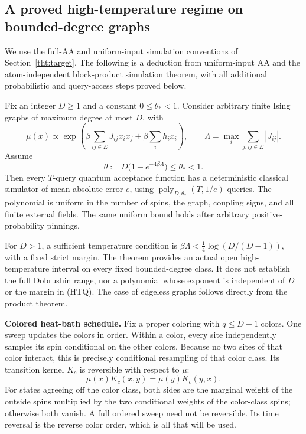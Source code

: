 \subsection{A proved high-temperature regime on bounded-degree graphs}
\label{resolution-dynamics:theorem}

We use the full-AA and uniform-input simulation conventions of
Section~\ref{tht:target}. The following is a deduction from uniform-input
AA and the atom-independent block-product simulation theorem, with all
additional probabilistic and query-access steps proved below.

\begin{theorem}
\label{thm:resolution-dynamics-ising}
Fix an integer \(D\ge1\) and a constant \(0\le\theta_*<1\). Consider
arbitrary finite Ising graphs of maximum degree at most \(D\), with
\[
 \mu(x)\propto\exp\left(
     \beta\sum_{ij\in E}J_{ij}x_ix_j+\beta\sum_i h_ix_i\right),
 \qquad
 \Lambda=\max_i\sum_{j:ij\in E}|J_{ij}|.
\]
Assume
\[
 \theta:=D\bigl(1-e^{-4\beta\Lambda}\bigr)\le\theta_*<1.
 \tag{HTQ}
\]
Then every \(T\)-query quantum acceptance function has a deterministic
classical simulator of mean absolute error \(e\), using
\(\operatorname{poly}_{D,\theta_*}(T,1/e)\) queries. The polynomial
is uniform in the number of spins, the graph, coupling signs, and all
finite external fields. The same uniform bound holds after arbitrary
positive-probability pinnings.
\end{theorem}

For \(D>1\), a sufficient temperature condition is
\(\beta\Lambda<\frac14\log(D/(D-1))\), with a fixed strict margin.
The theorem provides an actual open high-temperature interval on every
fixed bounded-degree class. It does not establish the full Dobrushin
range, nor a polynomial whose exponent is independent of \(D\) or the
margin in (HTQ). The case of edgeless graphs follows directly from the
product theorem.

\textbf{Colored heat-bath schedule.}
Fix a proper coloring with \(q\le D+1\) colors. One sweep updates the
colors in order. Within a color, every site independently samples its
spin conditional on the other colors. Because no two sites of that
color interact, this is precisely conditional resampling of that color
class. Its transition kernel \(K_c\) is reversible with respect to
\(\mu\):
\[
 \mu(x)K_c(x,y)=\mu(y)K_c(y,x).
 \tag{DB}
\]
For states agreeing off the color class, both sides are the marginal
weight of the outside spins multiplied by the two conditional weights
of the color-class spins; otherwise both vanish. A full ordered sweep
need not be reversible. Its time reversal is the reverse color order,
which is all that will be used.

